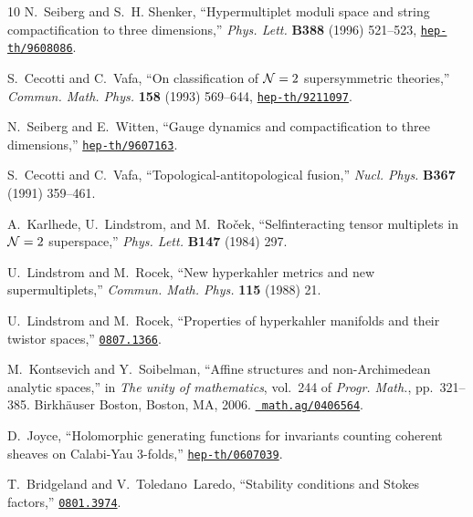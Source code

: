 \begin{thebibliography}{10}
N.~Seiberg and S.~H. Shenker, ``Hypermultiplet moduli space and string
  compactification to three dimensions,'' {\em Phys. Lett.} {\bf B388} (1996)
  521--523,
\href{http://www.arXiv.org/abs/hep-th/9608086}{{\tt hep-th/9608086}}.

S.~Cecotti and C.~Vafa, ``On classification of {$\mathcal{N}=2$} supersymmetric
  theories,'' {\em Commun. Math. Phys.} {\bf 158} (1993) 569--644,
\href{http://www.arXiv.org/abs/hep-th/9211097}{{\tt hep-th/9211097}}.

N.~Seiberg and E.~Witten, ``Gauge dynamics and compactification to three
  dimensions,''
\href{http://www.arXiv.org/abs/hep-th/9607163}{{\tt hep-th/9607163}}.

S.~Cecotti and C.~Vafa, ``Topological-antitopological fusion,'' {\em Nucl.
  Phys.} {\bf B367} (1991)
359--461.

A.~Karlhede, U.~Lindstrom, and M.~Ro\v{c}ek, ``Selfinteracting tensor
  multiplets in {$\mathcal{N}=2$} superspace,'' {\em Phys. Lett.} {\bf B147} (1984)
297.

U.~Lindstrom and M.~Rocek, ``New hyperkahler metrics and new supermultiplets,''
  {\em Commun. Math. Phys.} {\bf 115} (1988)
21.

U.~Lindstrom and M.~Rocek, ``{Properties of hyperkahler manifolds and their
  twistor spaces},''
\href{http://www.arXiv.org/abs/0807.1366}{{\tt 0807.1366}}.

M.~Kontsevich and Y.~Soibelman, ``Affine structures and non-{A}rchimedean
  analytic spaces,'' in {\em The unity of mathematics}, vol.~244 of {\em Progr.
  Math.}, pp.~321--385.
\newblock Birkh\"auser Boston, Boston, MA, 2006.
\newblock \href{http://www.arXiv.org/abs/math.ag/0406564}{{\tt
  math.ag/0406564}}.

D.~Joyce, ``{H}olomorphic generating functions for invariants counting coherent
  sheaves on {C}alabi-{Y}au 3-folds,''
\href{http://www.arXiv.org/abs/hep-th/0607039}{{\tt hep-th/0607039}}.

T.~Bridgeland and V.~Toledano~Laredo, ``{S}tability conditions and {S}tokes
  factors,'' \href{http://www.arXiv.org/abs/0801.3974}{{\tt 0801.3974}}.


\end{thebibliography}
